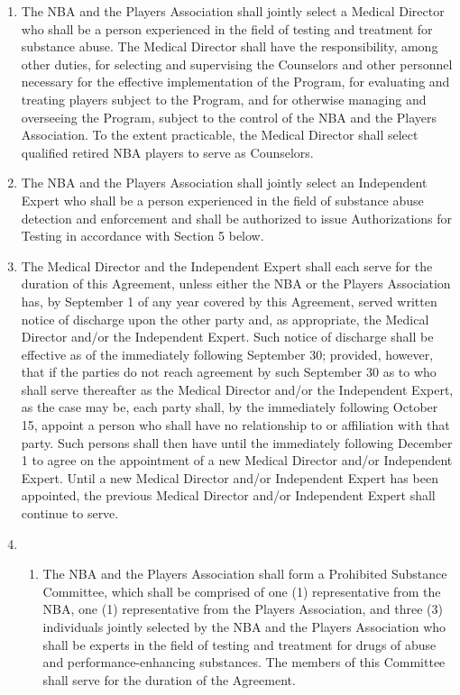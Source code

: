 \documentclass[
]{book}
\providecommand{\tightlist}{%
  \setlength{\itemsep}{0pt}\setlength{\parskip}{0pt}}
\begin{document}
\begin{enumerate}
\def\labelenumi{(\alph{enumi})}
\item
  The NBA and the Players Association shall jointly select a Medical Director who shall be a person experienced in the field of testing and treatment for substance abuse. The Medical Director shall have the responsibility, among other duties, for selecting and supervising the Counselors and other personnel necessary for the effective implementation of the Program, for evaluating and treating players subject to the Program, and for otherwise managing and overseeing the Program, subject to the control of the NBA and the Players Association. To the extent practicable, the Medical Director shall select qualified retired NBA players to serve as Counselors.
\item
  The NBA and the Players Association shall jointly select an Independent Expert who shall be a person experienced in the field of substance abuse detection and enforcement and shall be authorized to issue Authorizations for Testing in accordance with Section 5 below.
\item
  The Medical Director and the Independent Expert shall each serve for the duration of this Agreement, unless either the NBA or the Players Association has, by September 1 of any year covered by this Agreement, served written notice of discharge upon the other party and, as appropriate, the Medical Director and/or the Independent Expert. Such notice of discharge shall be effective as of the immediately following September 30; provided, however, that if the parties do not reach agreement by such September 30 as to who shall serve thereafter as the Medical Director and/or the Independent Expert, as the case may be, each party shall, by the immediately following October 15, appoint a person who shall have no relationship to or affiliation with that party. Such persons shall then have until the immediately following December 1 to agree on the appointment of a new Medical Director and/or Independent Expert. Until a new Medical Director and/or Independent Expert has been appointed, the previous Medical Director and/or Independent Expert shall continue to serve.
\item
  \begin{enumerate}
  \def\labelenumii{(\roman{enumii})}
  \tightlist
  \item
    The NBA and the Players Association shall form a Prohibited Substance Committee, which shall be comprised of one (1) representative from the NBA, one (1) representative from the Players Association, and three (3) individuals jointly selected by the NBA and the Players Association who shall be experts in the field of testing and treatment for drugs of abuse and performance-enhancing substances. The members of this Committee shall serve for the duration of the Agreement.

\end{enumerate}
\end{enumerate}
\end{document}
